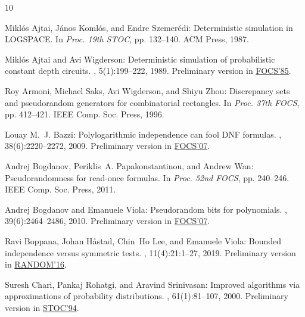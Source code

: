 \documentclass[11pt]{article}
\numberwithin{equation}{section}
\theoremstyle{definition}
\theoremstyle{plain}
\begin{document}
\tocrefpdfbookmark
\begin{thebibliography}{10}

{\sc Mikl{\'o}s Ajtai, J{\'a}nos Koml{\'o}s, and Endre Szemer{\'e}di}:
  Deterministic simulation in {LOGSPACE}.
\newblock In {\em Proc. 19th STOC}, pp. 132--140. ACM Press, 1987.
\newblock [\epfmtdoi{10.1145/28395.28410}]

{\sc Mikl{\'o}s Ajtai and Avi Wigderson}: Deterministic simulation of
  probabilistic constant depth circuits.
, 5(1):199--222, 1989.
\newblock Preliminary version in
  \href{https://doi.org/10.1109/SFCS.1985.19}{FOCS'85}.

{\sc Roy Armoni, Michael Saks, Avi Wigderson, and Shiyu Zhou}: Discrepancy sets
  and pseudorandom generators for combinatorial rectangles.
\newblock In {\em Proc. 37th FOCS}, pp. 412--421. IEEE Comp. Soc. Press, 1996.

{\sc Louay M.~J. Bazzi}: Polylogarithmic independence can fool {DNF} formulas.
, 38(6):2220--2272, 2009.
\newblock Preliminary version in
  \href{https://doi.org/10.1109/FOCS.2007.28}{FOCS'07}.
\newblock [\epfmtdoi{10.1137/070691954}]

{\sc Andrej Bogdanov, Periklis~A. Papakonstantinou, and Andrew Wan}:
  Pseudorandomness for read-once formulas.
\newblock In {\em Proc. 52nd FOCS}, pp. 240--246. IEEE Comp. Soc. Press, 2011.

{\sc Andrej Bogdanov and Emanuele Viola}: Pseudorandom bits for polynomials.
, 39(6):2464--2486, 2010.
\newblock Preliminary version in
  \href{https://doi.org/10.1109/FOCS.2007.42}{FOCS'07}.
\newblock [\epfmtdoi{10.1137/070712109}]

{\sc Ravi Boppana, Johan H{\aa}stad, Chin~Ho Lee, and Emanuele Viola}: Bounded
  independence versus symmetric tests.
, 11(4):21:1--27, 2019.
\newblock Preliminary version in
  \href{https://doi.org/10.4230/LIPIcs.APPROX-RANDOM.2016.24}{RANDOM'16}.
\newblock [\epfmtdoi{10.1145/3337783}]

{\sc Suresh Chari, Pankaj Rohatgi, and Aravind Srinivasan}: Improved algorithms
  via approximations of probability distributions.
, 61(1):81--107, 2000.
\newblock Preliminary version in
  \href{https://doi.org/10.1145/195058.195411}{STOC'94}.


\end{thebibliography}
\end{document}
